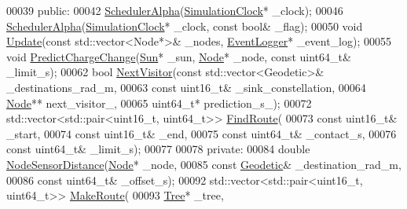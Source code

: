 \begin{DoxyCode}
00039  \textcolor{keyword}{public}:
00042   \hyperlink{classosse_1_1collaborate_1_1_scheduler_alpha_abf962f131875a1091699fe16a4d0eeb8}{SchedulerAlpha}(\hyperlink{classosse_1_1collaborate_1_1_simulation_clock}{SimulationClock}* \_clock);
00046   \hyperlink{classosse_1_1collaborate_1_1_scheduler_alpha_abf962f131875a1091699fe16a4d0eeb8}{SchedulerAlpha}(\hyperlink{classosse_1_1collaborate_1_1_simulation_clock}{SimulationClock}* \_clock, \textcolor{keyword}{const} \textcolor{keywordtype}{bool}& \_flag);
00050   \textcolor{keywordtype}{void} \hyperlink{classosse_1_1collaborate_1_1_scheduler_alpha_a375c441e048ff73c2d97816d9c9cb29e}{Update}(\textcolor{keyword}{const} std::vector<Node*>& \_nodes, \hyperlink{classosse_1_1collaborate_1_1_event_logger}{EventLogger}* \_event\_log);
00055   \textcolor{keywordtype}{void} \hyperlink{classosse_1_1collaborate_1_1_scheduler_alpha_a78709b9ddc8f6dd9b380432f6deedbb1}{PredictChargeChange}(\hyperlink{classosse_1_1collaborate_1_1_sun}{Sun}* \_sun, \hyperlink{classosse_1_1collaborate_1_1_node}{Node}* \_node, \textcolor{keyword}{const} uint64\_t& \_limit\_s);
00062   \textcolor{keywordtype}{bool} \hyperlink{classosse_1_1collaborate_1_1_scheduler_alpha_ab757ae48c70b3409beb483d977bd62f5}{NextVisitor}(\textcolor{keyword}{const} std::vector<Geodetic>& \_destinations\_rad\_m,
00063                    \textcolor{keyword}{const} uint16\_t& \_sink\_constellation,
00064                    \hyperlink{classosse_1_1collaborate_1_1_node}{Node}** next\_visitor\_,
00065                    uint64\_t* prediction\_s\_);
00072   std::vector<std::pair<uint16\_t, uint64\_t>> \hyperlink{classosse_1_1collaborate_1_1_scheduler_alpha_abf3bad26233bb4a9094a0236bc380f8e}{FindRoute}(
00073       \textcolor{keyword}{const} uint16\_t& \_start,
00074       \textcolor{keyword}{const} uint16\_t& \_end,
00075       \textcolor{keyword}{const} uint64\_t& \_contact\_s,
00076       \textcolor{keyword}{const} uint64\_t& \_limit\_s);
00077 
00078  \textcolor{keyword}{private}:
00084   \textcolor{keywordtype}{double} \hyperlink{classosse_1_1collaborate_1_1_scheduler_alpha_a3347ebdec27431be3bbd389e1dad88a6}{NodeSensorDistance}(\hyperlink{classosse_1_1collaborate_1_1_node}{Node}* \_node,
00085                             \textcolor{keyword}{const} \hyperlink{classosse_1_1collaborate_1_1_geodetic}{Geodetic}& \_destination\_rad\_m,
00086                             \textcolor{keyword}{const} uint64\_t& \_offset\_s);
00092   std::vector<std::pair<uint16\_t, uint64\_t>> \hyperlink{classosse_1_1collaborate_1_1_scheduler_alpha_af858a8d223a945fd93235d0b68a44cee}{MakeRoute}(
00093       \hyperlink{classosse_1_1collaborate_1_1_tree}{Tree}* \_tree,

\end{DoxyCode}
